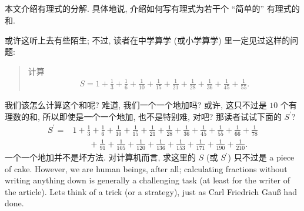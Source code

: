 \subsection*{\DecompositionOfRationalExpressions}
\markright{\DecompositionOfRationalExpressions}

本文介绍有理式的分解. 具体地说, 介绍如何写有理式为若干个 ``简单的'' 有理式的和.

或许这听上去有些陌生; 不过, 读者在中学算学 (或小学算学) 里一定见过这样的问题:
\begin{quotation}
    计算
    \begin{align*}
        S = 1 + \frac{1}{3} + \frac{1}{6} + \frac{1}{10} + \frac{1}{15} + \frac{1}{21} + \frac{1}{28} + \frac{1}{36} + \frac{1}{45} + \frac{1}{55}.
    \end{align*}
\end{quotation}
我们该怎么计算这个和呢? 难道, 我们一个一个地加吗? 或许, 这只不过是 $10$ 个有理数的和, 所以即使是一个一个地加, 也不是特别难, 对吧? 那读者试试下面的 $S^{\prime}$?
\begin{align*}
    S^{\prime}
    = {} & 1 + \frac{1}{3} + \frac{1}{6} + \frac{1}{10} + \frac{1}{15} + \frac{1}{21} + \frac{1}{28} + \frac{1}{36} + \frac{1}{45} + \frac{1}{55} + \frac{1}{66} + \frac{1}{78} \\
         & \qquad + \frac{1}{91} + \frac{1}{105} + \frac{1}{120} + \frac{1}{136} + \frac{1}{153} + \frac{1}{171} + \frac{1}{190} + \frac{1}{210}.
\end{align*}
一个一个地加并不是坏方法. 对计算机而言, 求这里的 $S$ (或 $S^{\prime}$) 只不过是 a piece of cake. However, we are human beings, after all; calculating fractions without writing anything down is generally a challenging task (at least for the writer of the article). Let\apostrophe s think of a trick (or a strategy), just as Carl Friedrich Gauß had done.

